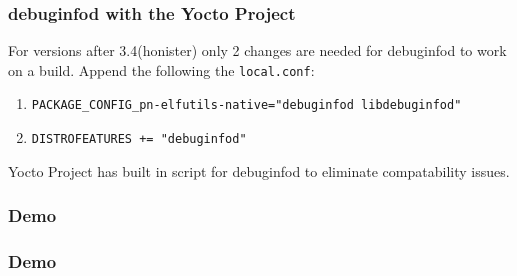 \documentclass[12pt]{beamer}
\begin{document}
\begin{frame}[fragile]
   \frametitle{ debuginfod with the Yocto Project}
   For versions after 3.4(honister) only 2 changes are needed for debuginfod
   to work on a build. Append the following the \verb|local.conf|:
   \begin{small}
   \begin{enumerate}
      \item \verb|PACKAGE_CONFIG_pn-elfutils-native="debuginfod libdebuginfod"|
      \item \verb|DISTROFEATURES += "debuginfod"|
   \end{enumerate}
   \end{small}
   Yocto Project has built in script for debuginfod to eliminate compatability issues. 
\end{frame}




\begin{frame}
   \frametitle{ Demo}
\end{frame}

\begin{frame}
   \frametitle{ Demo}
\end{frame}
\end{document}
